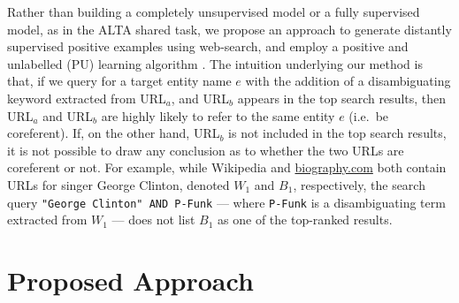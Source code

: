 \documentclass[letterpaper]{sig-alternate-2013}
\newcommand{\query}[1]{\texttt{#1}\xspace}
\begin{document}
% 
Rather than building a completely unsupervised model \cite{chisholm2016akbc, delgado2014data, nuray2009exploiting} or a fully supervised model, as in the ALTA shared task, we propose an approach to generate distantly supervised positive examples using web-search, and employ a positive and unlabelled (PU) learning algorithm \cite{Elkan:2008:LCO:1401890.1401920, liu2002partially}. The intuition underlying our method is that, if we query for a target entity name $e$ with the addition of a disambiguating keyword extracted from URL$_{a}$, and URL$_{b}$ appears in the top search results, then URL$_a$ and URL$_b$ are highly likely to refer to the same entity $e$ (i.e.\ be coreferent). If, on the other hand, URL$_{b}$ is not included in the top search results, it is not possible to draw any conclusion as to whether the two URLs are coreferent or not. For example, while Wikipedia and \url{biography.com} both contain URLs for singer George Clinton, denoted $W_1$ and $B_1$, respectively, the search query \query{"George Clinton" AND P-Funk} --- where \query{P-Funk} is a disambiguating term extracted from $W_1$ --- does not list $B_1$ as one of the top-ranked results. 

\section{Proposed Approach}
\end{document}
